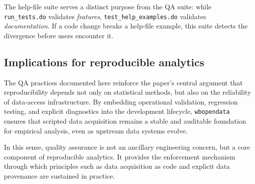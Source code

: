 \documentclass[bib]{statapress}
\begin{document}
The help-file suite serves a distinct purpose from the QA suite: while
\texttt{run\_tests.do} validates \emph{features}, \texttt{test\_help\_examples.do}
validates \emph{documentation}. If a code change breaks a help-file example,
this suite detects the divergence before users encounter it.

\subsection{Implications for reproducible analytics}

The QA practices documented here reinforce the paper’s central argument that
reproducibility depends not only on statistical methods, but also on the
reliability of data-access infrastructure. By embedding operational validation,
regression testing, and explicit diagnostics into the development lifecycle,
\texttt{wbopendata} ensures that scripted data acquisition remains a stable and
auditable foundation for empirical analysis, even as upstream data systems
evolve.

In this sense, quality assurance is not an ancillary engineering concern, but a
core component of reproducible analytics. It provides the enforcement mechanism
through which principles such as data acquisition as code and explicit data
provenance are sustained in practice.
\end{document}

